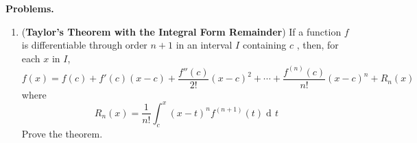 \documentclass[10pt]{article}
\title{}
\date{}
\DeclareMathOperator{\xd}{d\!}
\begin{document}
\noindent
{\bf Problems.}
\begin{enumerate}
\item ({\bf Taylor's Theorem with the Integral Form Remainder}) If a function $f$  is differentiable through order $n+1$ in an interval $I$  containing $c$ , then, for each $x$ in $I$,
\[
	f(x) = f(c) + f'(c)(x-c) + \frac{f''(c)}{2!}(x-c)^2 + \cdots + \frac{f^{(n)}(c)}{n!}(x-c)^n + R_n(x)
\]
where
\[
R_n(x) = \frac{1}{n!}\int_c^x(x-t)^nf^{(n+1)}(t)\xd t
\]
Prove the theorem.
\end{enumerate}
\end{document}
